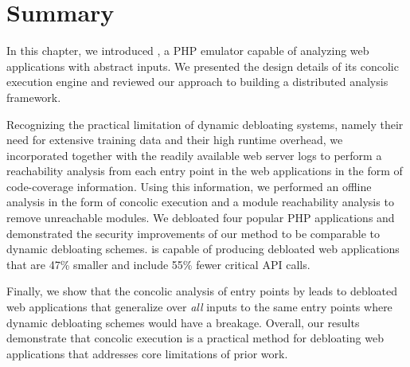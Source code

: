 \section{Summary}
In this chapter, we introduced \animatedead{}, a PHP emulator capable of analyzing web applications with abstract inputs. 
We presented the design details of its concolic execution engine and reviewed our approach to building a distributed analysis framework. 

Recognizing the practical limitation of dynamic debloating systems, namely their need for extensive training data and their high runtime overhead, 
we incorporated \animatedead{} together with the readily available web server logs to perform a reachability analysis from each entry point in the web applications in the form of code-coverage information. 
Using this information, we performed an offline analysis in the form of concolic execution and a module reachability analysis to remove unreachable modules. 
We debloated four popular PHP applications and demonstrated the security improvements of our method to be comparable to dynamic debloating schemes. 
\animatedead{} is capable of producing debloated web applications that are 47\% smaller and include 55\% fewer critical API calls. 

Finally, we show that the concolic analysis of entry points by \animatedead{} leads to debloated web applications that generalize over \emph{all} inputs to the same entry points where dynamic debloating schemes would have a breakage.  
Overall, our results demonstrate that concolic execution is a practical method for debloating web applications that addresses core limitations of prior work.
